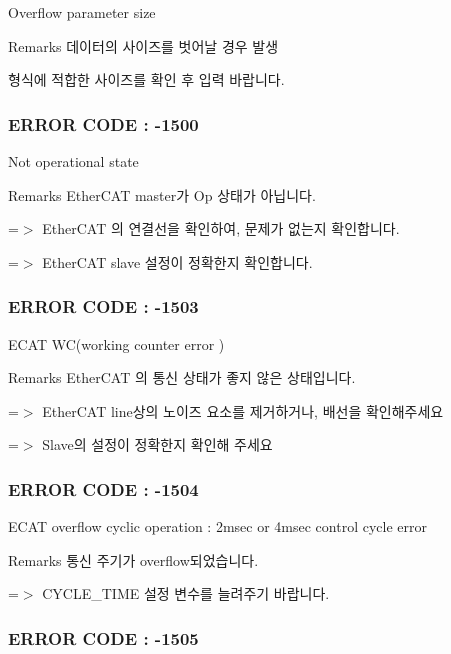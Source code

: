 Overflow parameter size \begin{DoxyRemark}{Remarks}
데이터의 사이즈를 벗어날 경우 발생\par
 형식에 적합한 사이즈를 확인 후 입력 바랍니다.
\end{DoxyRemark}


 \subsubsection*{E\-R\-R\-O\-R C\-O\-D\-E \-: -\/1500 }

Not operational state \begin{DoxyRemark}{Remarks}
Ether\-C\-A\-T master가 Op 상태가 아닙니다. \par
 =$>$ Ether\-C\-A\-T 의 연결선을 확인하여, 문제가 없는지 확인합니다. \par
 =$>$ Ether\-C\-A\-T slave 설정이 정확한지 확인합니다.
\end{DoxyRemark}


 \subsubsection*{E\-R\-R\-O\-R C\-O\-D\-E \-: -\/1503 }

E\-C\-A\-T W\-C(working counter error ) \begin{DoxyRemark}{Remarks}
Ether\-C\-A\-T 의 통신 상태가 좋지 않은 상태입니다. \par
 =$>$ Ether\-C\-A\-T line상의 노이즈 요소를 제거하거나, 배선을 확인해주세요 \par
 =$>$ Slave의 설정이 정확한지 확인해 주세요
\end{DoxyRemark}


 \subsubsection*{E\-R\-R\-O\-R C\-O\-D\-E \-: -\/1504 }

E\-C\-A\-T overflow cyclic operation \-: 2msec or 4msec control cycle error \begin{DoxyRemark}{Remarks}
통신 주기가 overflow되었습니다. \par
 =$>$ C\-Y\-C\-L\-E\-\_\-\-T\-I\-M\-E 설정 변수를 늘려주기 바랍니다.
\end{DoxyRemark}


 \subsubsection*{E\-R\-R\-O\-R C\-O\-D\-E \-: -\/1505 }

